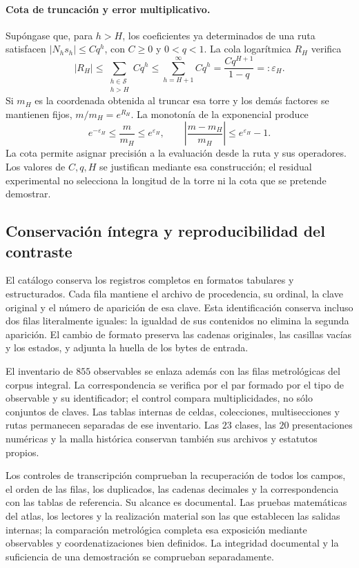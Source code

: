 \paragraph{Cota de truncación y error multiplicativo.}
Supóngase que, para \(h>H\), los coeficientes ya determinados de una
ruta satisfacen \(|N_hs_h|\leq Cq^h\), con \(C\geq0\) y
\(0<q<1\). La cola logarítmica \(R_H\) verifica
\[
 |R_H|\leq\sum_{\substack{h\in\mathcal S\\h>H}}Cq^h
 \leq\sum_{h=H+1}^{\infty}Cq^h
 =\frac{Cq^{H+1}}{1-q}=:\varepsilon_H.
\]
Si \(m_H\) es la coordenada obtenida al truncar esa torre y los demás
factores se mantienen fijos, \(m/m_H=e^{R_H}\). La monotonía de la
exponencial produce
\[
 e^{-\varepsilon_H}\leq\frac{m}{m_H}\leq e^{\varepsilon_H},
 \qquad
 \left|\frac{m-m_H}{m_H}\right|\leq e^{\varepsilon_H}-1.
\]
La cota permite asignar precisión a la evaluación desde la ruta y sus
operadores. Los valores de \(C,q,H\) se justifican mediante esa
construcción; el residual experimental no selecciona la longitud de la
torre ni la cota que se pretende demostrar.

\subsection{Conservación íntegra y reproducibilidad del contraste}
\label{subsec:vi-catalogo-reproducible}

El catálogo conserva los registros completos en formatos tabulares y
estructurados. Cada fila mantiene el archivo de procedencia, su ordinal,
la clave original y el número de aparición de esa clave. Esta
identificación conserva incluso dos filas literalmente iguales: la
igualdad de sus contenidos no elimina la segunda aparición. El cambio
de formato preserva las cadenas originales, las casillas vacías y los
estados, y adjunta la huella de los bytes de entrada.

El inventario de \(855\) observables se enlaza además con las filas
metrológicas del corpus integral. La correspondencia se verifica
por el par formado por el tipo de observable y su identificador; el
control compara multiplicidades, no sólo conjuntos de claves. Las tablas
internas de celdas, colecciones, multisecciones y rutas permanecen separadas
de ese inventario. Las \(23\) clases, las \(20\) presentaciones
numéricas y la malla histórica conservan también sus archivos y estatutos
propios.

Los controles de transcripción comprueban la recuperación de todos los
campos, el orden de las filas, los duplicados, las cadenas decimales y la
correspondencia con las tablas de referencia. Su alcance es documental.
Las pruebas matemáticas del atlas, los lectores y la realización material
son las que establecen las salidas internas; la comparación metrológica
completa esa exposición mediante observables y coordenatizaciones bien definidos.
La integridad documental y la suficiencia de una demostración se
comprueban separadamente.

